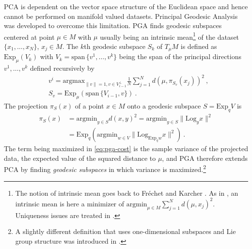 \documentclass[final]{svjour3}
\newcommand{\argmin}{\mathrm{argmin}}
\newcommand{\argmax}{\mathrm{argmax}}
\newcommand{\Span}{\mathrm{span}\,}
\newcommand{\Exp}{\mathrm{Exp}}
\newcommand{\Log}{\mathrm{Log}}
\begin{document}
PCA is dependent on the vector space structure of the Euclidean space and hence cannot be performed 
on manifold valued datasets. Principal Geodesic
Analysis was developed to overcome this limitation. 
PGA finds geodesic subspaces centered at point $\mu\in M$ with $\mu$ usually being
an intrinsic mean\footnote{
The notion of intrinsic mean goes back to Fr\'echet \cite{frechet_les_1948} 
and Karcher \cite{karcher_riemannian_1977}.
As in \cite{fletcher_principal_2004-1}, an intrinsic mean is here a minimizer of
$\argmin_{\mu\in M}\sum_{j=1}^Nd(\mu,x_j)^2$. Uniqueness issues are treated in 
\cite{karcher_riemannian_1977}.
}
of the dataset $\{x_1,\ldots,x_N\}$, $x_j\in M$.
The $k$th geodesic subspace $S_k$ of $T_\mu M$ is defined as
$\Exp_\mu(V_k)$ with $V_k=\Span\{v^1,\ldots,v^k\}$ 
being the span of the principal directions $v^1,\ldots,v^k$ defined recursively by
\begin{equation}
    \begin{split}
    &
    v^i
    =
    \argmax_{\|v\|=1,v\in V_{i-1}^\perp}
    \frac{1}{N}
    \sum_{j=1}^Nd(\mu,\pi_{S_v}(x_j))^2
    \ ,\\
    &S_v
    =
    \Exp_\mu(\Span\{V_{i-1},v\})
    \ .
    \end{split}
    \label{eq:pga-cost}
\end{equation}
The projection
$\pi_S(x)$ of a point $x\in M$
onto a geodesic subspace $S=\Exp_qV$ is
\begin{equation}
    \begin{split}
    \pi_S(x)
    &=
    \argmin_{y\in S}d(x,y)^2
    =
    \argmin_{y\in S}\|\Log_yx\|^2
    \\
    &=
    \Exp_q(\argmin_{w\in V}\|\Log_{\Exp_qw}x\|^2)
    \ .
    \end{split}
    \label{eq:proj-cost}
\end{equation}
The term being maximized in \eqref{eq:pga-cost} is the sample variance of the projected data, the expected value of the
squared distance to $\mu$, and PGA therefore extends PCA by finding \emph{geodesic subspaces} in 
which variance is maximized.\footnote{
A slightly different definition that uses 
one-dimensional subspaces and Lie group structure was introduced
in \cite{fletcher_statistics_2003}.
}
\end{document}
